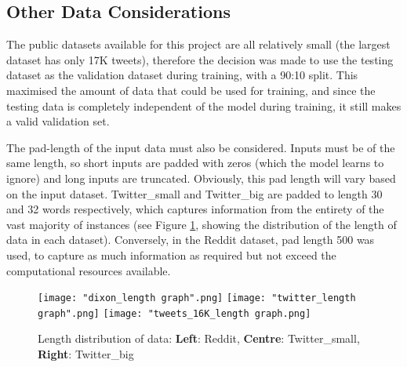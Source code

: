 \documentclass[12pt,a4paper]{article}
\begin{document}
\subsection{Other Data Considerations}
The public datasets available for this project are all relatively small (the largest dataset has only 17K tweets), therefore the decision was made to use the testing dataset as the validation dataset during training, with a 90:10 split. This maximised the amount of data that could be used for training, and since the testing data is completely independent of the model during training, it still makes a valid validation set. 

The pad-length of the input data must also be considered. Inputs must be of the same length, so short inputs are padded with zeros (which the model learns to ignore) and long inputs are truncated. Obviously, this pad length will vary based on the input dataset. Twitter\_small and Twitter\_big are padded to length 30 and 32 words respectively, which captures information from the entirety of the vast majority of instances (see Figure \ref{len:len3}, showing the distribution of the length of data in each dataset). Conversely, in the Reddit dataset, pad length 500 was used, to capture as much information as required but not exceed the computational resources available.

\begin{figure}[H]
	\centering
	\hspace*{-0.10\textwidth}
	\texttt{[image: "dixon\_length graph".png]} \hfill
	\texttt{[image: "twitter\_length graph".png]}\hfill
	\texttt{[image: "tweets\_16K\_length graph.png]} \hfill
	\hspace*{-0.10\textwidth}
	
	\caption{Length distribution of data: \textbf{Left}: Reddit, \textbf{Centre}: Twitter\_small, \textbf{Right}: Twitter\_big}
	\label{len:len3}
	
\end{figure}
\end{document}
